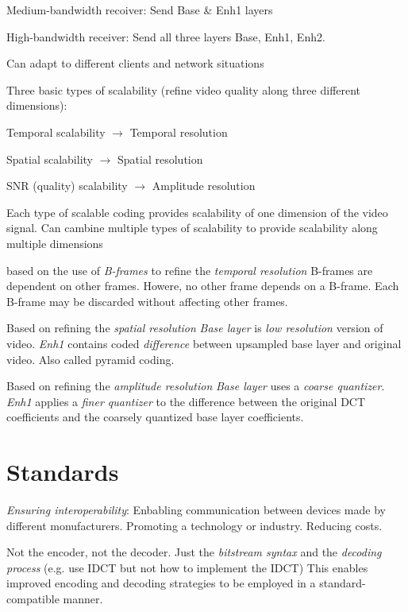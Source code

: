 \begin{compactdesc}
\begin{itemize*}[label=\colorbullet]
		\item Medium-bandwidth recoiver: Send Base \& Enh1 layers\\
		\item High-bandwidth receiver: Send all three layers Base, Enh1, Enh2.\\
		\item Can adapt to different clients and network situations\\
		\item Three basic types of scalability (refine video quality along three different dimensions):\\
			\begin{enumerate*}[label=\quad\protect\circled{\alph*},itemjoin=]
				\item Temporal scalability $\to$ Temporal resolution\\
				\item Spatial scalability $\to$ Spatial resolution\\
				\item SNR (quality) scalability $\to$ Amplitude resolution\\
			\end{enumerate*}
		\item Each type of scalable coding provides scalability of one dimension of the video signal. Can cambine multiple types of scalability to provide scalability along multiple dimensions
	\end{itemize*}
\item[\lp{Temporal Scalability}] based on the use of \emph{B-frames} to refine the \emph{temporal resolution} B-frames are dependent on other frames. Howere, no other frame depends on a B-frame. Each B-frame may be discarded without affecting other frames. 
\item[\lp{Spatial scalability}] Based on refining the \emph{spatial resolution} \emph{Base layer} is \emph{low resolution} version of video. \emph{Enh1} contains coded \emph{difference} between upsampled base layer and original video. Also called pyramid coding.
\item[\lp{SNR scalability}] Based on refining the \emph{amplitude resolution} \emph{Base layer} uses a \emph{coarse quantizer}. \emph{Enh1} applies a \emph{finer quantizer} to the difference between the original DCT coefficients and the coarsely quantized base layer coefficients.
\section{Standards}
	\item[\lp{Goal}] \emph{Ensuring interoperability}: Enbabling communication between devices made by different monufacturers. Promoting a technology or industry. Reducing costs.
	\item[\lp{Scope of standardization}] Not the encoder, not the decoder. Just the \emph{bitstream syntax} and the \emph{decoding process} (e.g. use IDCT but not how to implement the IDCT) This enables improved encoding and decoding strategies to be employed in a standard-compatible manner.

\end{compactdesc}
